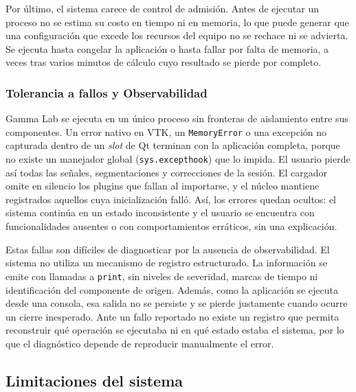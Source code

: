\documentclass[11pt,a4paper]{article}
\DeclareRobustCommand{\_}{\textunderscore\allowbreak}
\begin{document}
Por último, el sistema carece de control de admisión. Antes de ejecutar un proceso no se estima su costo en tiempo ni en memoria, lo que puede generar que una configuración que excede los recursos del equipo no se rechace ni se advierta. Se ejecuta hasta congelar la aplicación o hasta fallar por falta de memoria, a veces tras varios minutos de cálculo cuyo resultado se pierde por completo.

\subsubsection{Tolerancia a fallos y Observabilidad}
\label{sec:diag_fallos}

Gamma Lab se ejecuta en un único proceso sin fronteras de aislamiento entre sus componentes. Un error nativo en VTK, un \texttt{MemoryError} o una excepción no capturada dentro de un \textit{slot} de Qt terminan con la aplicación completa, porque no existe un manejador global (\texttt{sys.excepthook}) que lo impida. El usuario pierde así todas las señales, segmentaciones y correcciones de la sesión. El cargador omite en silencio los plugins que fallan al importarse, y el núcleo mantiene registrados aquellos cuya inicialización falló. Así, los errores quedan ocultos: el sistema continúa en un estado inconsistente y el usuario se encuentra con funcionalidades ausentes o con comportamientos erráticos, sin una explicación.

Estas fallas son difíciles de diagnosticar por la ausencia de observabilidad. El sistema no utiliza un mecanismo de registro estructurado. La información se emite con llamadas a \texttt{print}, sin niveles de severidad, marcas de tiempo ni identificación del componente de origen. Además, como la aplicación se ejecuta desde una consola, esa salida no se persiste y se pierde justamente cuando ocurre un cierre inesperado. Ante un fallo reportado no existe un registro que permita reconstruir qué operación se ejecutaba ni en qué estado estaba el sistema, por lo que el diagnóstico depende de reproducir manualmente el error.


\subsection{Limitaciones del sistema}
\label{sec:limitaciones}
\end{document}
